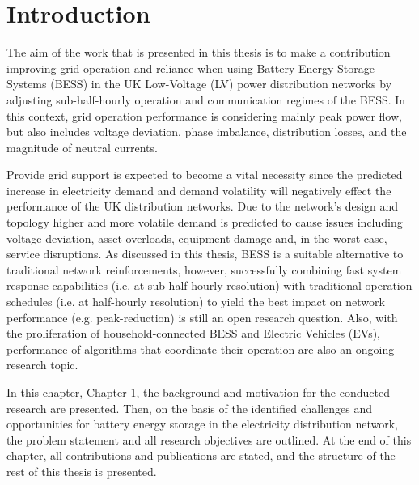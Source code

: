 \chapter{Introduction}
\label{ch-introduction}

The aim of the work that is presented in this thesis is to make a contribution improving grid operation and reliance when using Battery Energy Storage Systems (BESS) in the UK Low-Voltage (LV) power distribution networks by adjusting sub-half-hourly operation and communication regimes of the BESS.
In this context, grid operation performance is considering mainly peak power flow, but also includes voltage deviation, phase imbalance, distribution losses, and the magnitude of neutral currents.

Provide grid support is expected to become a vital necessity since the predicted increase in electricity demand and demand volatility will negatively effect the performance of the UK distribution networks.
Due to the network's design and topology higher and more volatile demand is predicted to cause issues including voltage deviation, asset overloads, equipment damage and, in the worst case, service disruptions.
As discussed in this thesis, BESS is a suitable alternative to traditional network reinforcements, however, successfully combining fast system response capabilities (i.e. at sub-half-hourly resolution) with traditional operation schedules (i.e. at half-hourly resolution) to yield the best impact on network performance (e.g. peak-reduction) is still an open research question.
Also, with the proliferation of household-connected BESS and Electric Vehicles (EVs), performance of algorithms that coordinate their operation are also an ongoing research topic.

In this chapter, Chapter \ref{ch-introduction}, the background and motivation for the conducted research are presented.
Then, on the basis of the identified challenges and opportunities for battery energy storage in the electricity distribution network, the problem statement and all research objectives are outlined.
At the end of this chapter, all contributions and publications are stated, and the structure of the rest of this thesis is presented.









